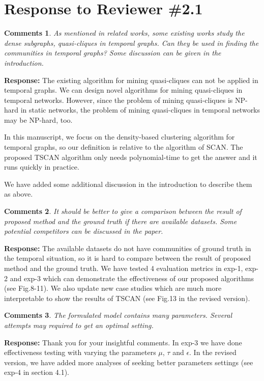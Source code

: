 \documentclass{article}
\newtheorem{Comments}{\textbf{Comments}}
\begin{document}
\section{Response to Reviewer \#2.1}
\setcounter{Comments}{0}
\begin{Comments}
As mentioned in related works, some existing works study the dense subgraphs, quasi-cliques in temporal graphs. Can they be used in finding the communities in temporal graphs? Some discussion can be given in the introduction.
\end{Comments}
\noindent \textbf{Response: }
The existing algorithm for mining quasi-cliques can not be applied in temporal graphs. We can design novel algorithms for mining quasi-cliques in temporal networks. However, since the problem of mining quasi-cliques is NP-hard in static networks, the problem of mining quasi-cliques in temporal networks may be NP-hard, too.

In this manuscript, we focus on the density-based clustering algorithm for temporal graphs, so our definition is relative to the algorithm of SCAN. The proposed TSCAN algorithm only needs polynomial-time to get the answer and it runs quickly in practice.

We have added some additional discussion in the introduction to describe them as above. 

\begin{Comments}
It should be better to give a comparison between the result of proposed method and the ground truth if there are available datasets.
Some potential competitors can be discussed in the paper.
\end{Comments}
\noindent \textbf{Response: } The available datasets do not have communities of ground truth in the temporal situation, so it is hard to compare  between the result of proposed method and the ground truth. We have tested 4 evaluation metrics in exp-1, exp-2 and exp-3 which can demonstrate the effectiveness of our proposed algorithms (see Fig.8-11). We also update new case studies which are much more interpretable to show the results of TSCAN (see Fig.13 in the revised version).


	
\begin{Comments}
The formulated model contains many parameters. Several attempts may required to get an optimal setting. 
\end{Comments}
\noindent \textbf{Response: } Thank you for your insightful comments. In exp-3 we have done effectiveness testing with varying the parameters $\mu$, $\tau$ and $\epsilon$. In the revised version, we have added more analyses of seeking better parameters settings (see exp-4 in section 4.1).
\end{document}
